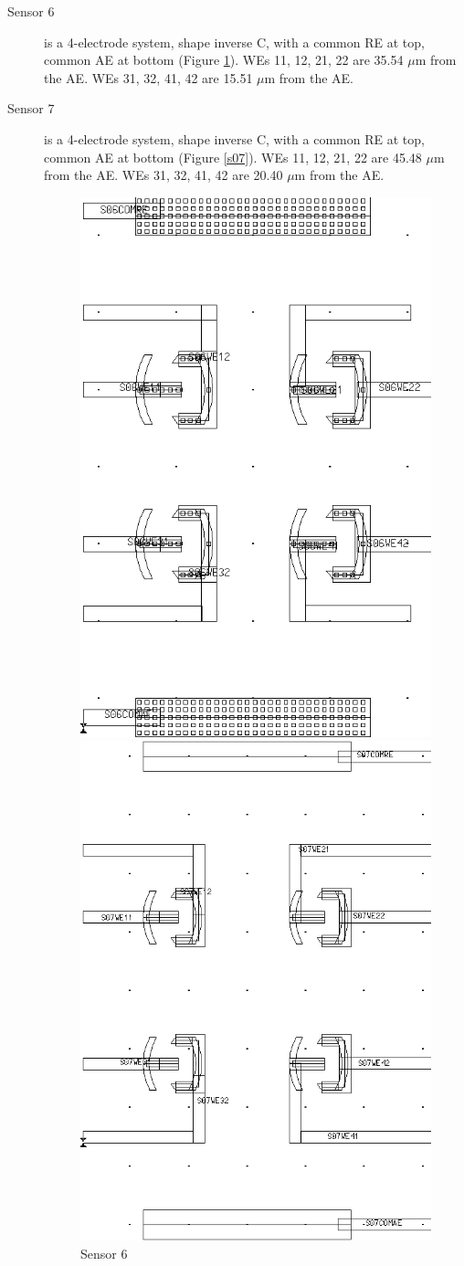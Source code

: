 \begin{description}
\item[Sensor 6] is a 4-electrode system, shape inverse C, with a common RE at top, common AE at bottom (Figure \ref{s06}). WEs 11, 12, 21, 22 are 35.54 $\mu \mathrm{m}$ from the AE. WEs 31, 32, 41, 42 are 15.51 $\mu \mathrm{m}$ from the AE.
\item[Sensor 7] is a 4-electrode system, shape inverse C, with a common RE at top, common AE at bottom (Figure \ref{s07}). WEs 11, 12, 21, 22 are 45.48 $\mu \mathrm{m}$ from the AE. WEs 31, 32, 41, 42 are 20.40 $\mu \mathrm{m}$ from the AE.

\begin{figure}
	\begin{minipage}{0.5\linewidth}
		\centering
		\includegraphics[width=0.6\linewidth]{figures/s06.png}
		\caption{Sensor 6}
		\label{s06}
	\end{minipage}
	\begin{minipage}{0.5\linewidth}
		\centering
		\includegraphics[width=0.6\linewidth]{figures/s07.png}

\end{minipage}
\end{figure}
\end{description}
